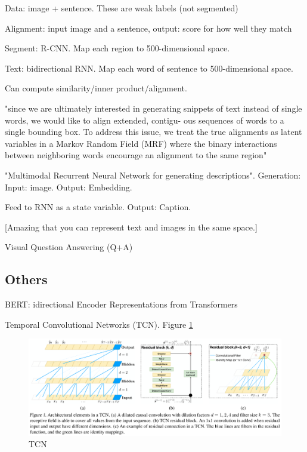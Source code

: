\documentclass[english]{article}
\begin{document}
\item Data:  image + sentence. These are weak labels (not segmented)

\item Alignment: input image and a sentence, output: score for how well they match

Segment: R-CNN. Map each region to 500-dimensional space.

Text: bidirectional RNN. Map each word of sentence to 500-dimensional space. 

Can compute similarity/inner product/alignment.

"since we are
ultimately interested in generating snippets of text instead
of single words, we would like to align extended, contigu-
ous sequences of words to a single bounding box.
To address this issue, we treat the true alignments as latent
variables in a Markov Random Field (MRF) where the binary interactions between neighboring words encourage an alignment to the same region"

\item "Multimodal Recurrent Neural Network for
generating descriptions". Generation: Input: image. Output: Embedding. 

Feed to RNN as a state variable. Output: Caption.

[Amazing that you can represent text and images in the same space.]
\eenum 

\item Visual Question Answering (Q+A)

\benum 
\item 
\eenum 

 
\eenum 


\subsection{Others}


\benum

\item BERT: idirectional Encoder Representations from Transformers

\item Temporal Convolutional Networks (TCN). Figure \ref{TCN}


\begin{figure}
  \centering
  \includegraphics[scale=0.4]{tcn.png}
    \caption{TCN}
    \label{TCN}
\end{figure}
\end{document}

